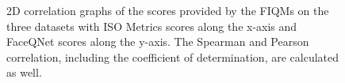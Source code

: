 \begin{figure}[h]
\centering
    \caption{2D correlation graphs of the scores provided by the FIQMs on the three datasets with ISO Metrics scores along the x-axis and FaceQNet scores along the y-axis. The Spearman and Pearson correlation, including the coefficient of determination, are calculated as well.}
    \label{fig:corrFIQMs}
\end{figure}

